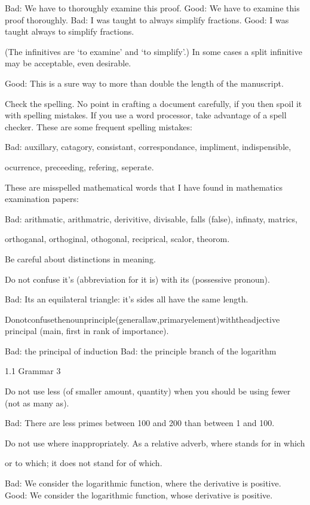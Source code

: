 \documentclass[11pt]{article}
\theoremstyle{plain}
\theoremstyle{definition}
\begin{document}
Bad: We have to thoroughly examine this proof. Good: We have to examine this proof thoroughly. Bad: I was taught to always simplify fractions. Good: I was taught always to simplify fractions.

(The infinitives are `to examine' and `to simplify'.) In some cases a split infinitive may be acceptable, even desirable.

Good: This is a sure way to more than double the length of the manuscript.

\textbullet{} Check the spelling. No point in crafting a document carefully, if you then spoil it with spelling mistakes. If you use a word processor, take advantage of a spell checker. These are some frequent spelling mistakes:

Bad: auxillary, catagory, consistant, correspondance, impliment, indispensible,

ocurrence, preceeding, refering, seperate.

These are misspelled mathematical words that I have found in mathematics examination papers:

Bad: arithmatic, arithmatric, derivitive, divisable, falls (false), infinaty, matrics,

orthoganal, orthoginal, othogonal, reciprical, scalor, theorom.

\textbullet{} Be careful about distinctions in meaning.

Do not confuse it's (abbreviation for it is) with its (possessive pronoun).

Bad: Its an equilateral triangle: it's sides all have the same length.

Donotconfusethenounprinciple(generallaw,primaryelement)withtheadjective principal (main, first in rank of importance).

Bad: the principal of induction Bad: the principle branch of the logarithm

1.1 Grammar 3

Do not use less (of smaller amount, quantity) when you should be using fewer (not as many as).

Bad: There are less primes between 100 and 200 than between 1 and 100.

\textbullet{} Do not use where inappropriately. As a relative adverb, where stands for in which

or to which; it does not stand for of which.

Bad: We consider the logarithmic function, where the derivative is positive. Good: We consider the logarithmic function, whose derivative is positive.
\end{document}
